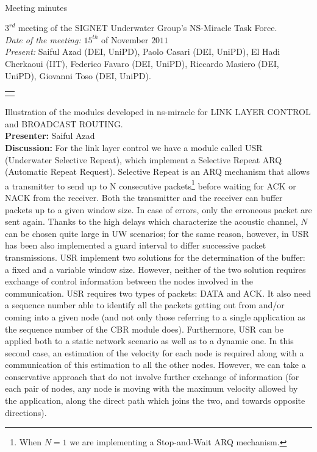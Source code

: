 \documentclass[11pt,journal,draftclsnofoot,onecolumn,twoside,letterpaper]{IEEEtran}
\theoremstyle{definition} \newtheorem{definition}[]{Definition}
\theoremstyle{theorem} \newtheorem{theorem}[]{Theorem}
\begin{document}
\pagestyle{empty}

\begin{Large} \\ \end{Large}
\begin{large} {Meeting minutes} \end{large}

\vspace{0.8cm}

 $3^{rd}$ meeting of the SIGNET Underwater Group's NS-Miracle Task Force.\\
{\it Date of the meeting: } $15^{th}$ of November $2011$\\
{\it Present: } Saiful Azad (DEI, UniPD), Paolo Casari (DEI, UniPD), El Hadi Cherkaoui (IIT), Federico Favaro (DEI, UniPD), Riccardo Masiero (DEI, UniPD), Giovanni Toso (DEI, UniPD).

\vspace{0.5cm}

\begin{tabular}{p{}}
 \hline \\
\end{tabular}

 Illustration of the modules developed in ns-miracle for LINK LAYER CONTROL and BROADCAST ROUTING.\\
{\bf Presenter:} Saiful Azad\\
{\bf Discussion:} For the link layer control we have a module called USR (Underwater Selective Repeat), which implement a Selective Repeat ARQ (Automatic Repeat Request). Selective Repeat is an ARQ mechanism that allows a transmitter to send up to N consecutive packets\footnote{When $N=1$ we are implementing a Stop-and-Wait ARQ mechanism.} before waiting for ACK or NACK from the receiver. Both the transmitter and the receiver can buffer packets up to a given window size. In case of errors, only the erroneous packet are sent again. Thanks to the high delays which characterize the acoustic channel, $N$ can be chosen quite large in UW scenarios; for the same reason, however, in USR has been also implemented a guard interval to differ successive packet transmissions. USR implement two solutions for the determination of the buffer: a fixed and a variable window size. However, neither of the two solution requires exchange of control information between the nodes involved in the communication. USR requires two types of packets: DATA and ACK. It also need a sequence number able to identify all the packets getting out from and/or coming into a given node (and not only those referring to a single application as the sequence number of the CBR module does). Furthermore, USR can be applied both to a static network scenario as well as to a dynamic one. In this second case, an estimation of the velocity for each node is required along with a communication of this estimation to all the other nodes. However, we can take a conservative approach that do not involve further exchange of information (for each pair of nodes, any node is moving with the maximum velocity allowed by the application, along the direct path which joins the two, and towards opposite directions).
\end{document}
